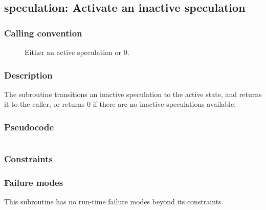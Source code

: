 \clearpage
{}
{}
\label{insn:dummy}
\subsection*{speculation: Activate an inactive speculation}

\subsubsection*{Calling convention}

\begin{description}
\item[] Either an active speculation or 0.
\end{description}

\subsubsection*{Description}

The  subroutine transitions an inactive
speculation to the active state, and returns it to the caller, or
returns 0 if there are no inactive speculations available.
\subsubsection*{Pseudocode}

\begin{verbatim}
\end{verbatim}

\subsubsection*{Constraints}

\subsubsection*{Failure modes}

This subroutine has no run-time failure modes beyond its constraints.
